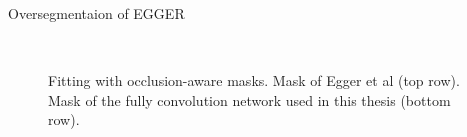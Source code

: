 \documentclass{beamer}
\begin{document}
\begin{frame}[c]{Oversegmentaion of EGGER}
	\begin{figure}
		\centering
		\qquad
		\qquad
		\\[.1em]
		
		\qquad
		\qquad
		
		\caption{Fitting with occlusion-aware masks. Mask of Egger et al (top row). Mask of the fully convolution network used in this thesis (bottom row). }
		\label{fig:3}
	\end{figure}
\end{frame}
\end{document}
